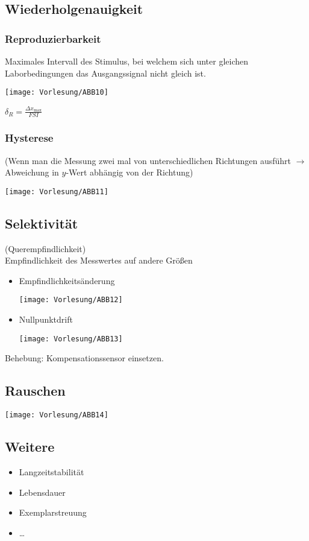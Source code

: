 \documentclass{scrreprt}
\begin{document}
\subsection{Wiederholgenauigkeit}
\subsubsection{Reproduzierbarkeit}
Maximales Intervall des Stimulus, bei welchem sich unter gleichen Laborbedingungen das Ausgangssignal nicht gleich ist.
\begin{center}
\texttt{[image: Vorlesung/ABB10]}
\end{center}
$\delta_R = \frac{\Delta x_{\text{max}}}{FSI}$

\subsubsection{Hysterese}
(Wenn man die Messung zwei mal von unterschiedlichen Richtungen ausführt $\to$ Abweichung in $y$-Wert abhängig von der Richtung)
\begin{center}
\texttt{[image: Vorlesung/ABB11]}
\end{center}

\subsection{Selektivität}
(Querempfindlichkeit)\\
Empfindlichkeit des Messwertes auf andere Größen
\begin{itemize}
\item Empfindlichkeitsänderung
\begin{center}
\texttt{[image: Vorlesung/ABB12]}
\end{center}
\item Nullpunktdrift
\begin{center}
\texttt{[image: Vorlesung/ABB13]}
\end{center}
\end{itemize}
Behebung: Kompensationssensor einsetzen.

\subsection{Rauschen}
\begin{center}
\texttt{[image: Vorlesung/ABB14]}
\end{center}

\subsection{Weitere}
\begin{itemize}
\item Langzeitstabilität
\item Lebensdauer
\item Exemplarstreuung
\item …
\end{itemize}
\end{document}

